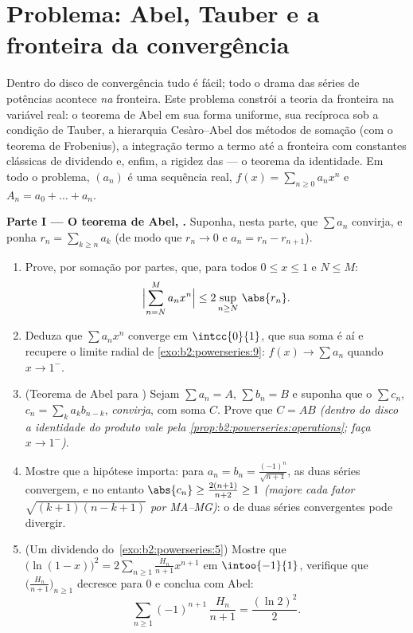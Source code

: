 \section{Problema: Abel, Tauber e a fronteira da convergência}

\begin{problem}\label{pb:b2:powerseries:1}
Dentro do disco de convergência tudo é fácil; todo o
drama das séries de potências acontece \emph{na} fronteira. Este
problema constrói a teoria da fronteira na variável real: o teorema de
Abel em sua forma uniforme, sua recíproca sob a condição de Tauber,
a hierarquia Cesàro--Abel dos métodos de somação
(com o teorema de Frobenius), a integração termo a termo até a
fronteira com constantes clássicas de dividendo e, enfim,
a rigidez das  --- o teorema da
identidade.
Em todo o problema, $(a_n)$ é uma sequência real, $f(x) = \sum_{n\geq0}
a_nx^n$ e $A_n = a_0 + \dots + a_n$.

\medskip
\noindent\textbf{Parte I --- O teorema de Abel, .} Suponha,
nesta parte, que $\sum a_n$ convirja, e ponha $r_n =
\sum_{k\geq n} a_k$ (de modo que $r_n \to 0$ e $a_n = r_n -
r_{n+1}$).
\begin{enumerate}
  \item Prove, por somação por partes, que, para todos $0 \leq x
        \leq 1$ e $N \leq M$:
        \[
        \Bigl|\sum_{n=N}^{M} a_n x^n\Bigr|
        \leq 2\sup_{n \geq N}\,\abs{r_n} .
        \]
  \item Deduza que $\sum a_nx^n$ converge \emph{} em
        $\intcc{0}{1}$, que sua soma é  aí e
        recupere o limite radial de
        \cref{exo:b2:powerseries:9}: $f(x) \to \sum a_n$ quando $x
        \to 1^-$.
  \item (Teorema de Abel para ) Sejam $\sum a_n = A$,
        $\sum b_n = B$ e suponha que o  $\sum
        c_n$, $c_n = \sum_{k} a_kb_{n-k}$, \emph{convirja},
        com soma $C$. Prove que $C = AB$ \emph{(dentro do disco a
        identidade do produto vale pela
        \cref{prop:b2:powerseries:operations}; faça $x \to
        1^-$)}.
  \item Mostre que a hipótese importa: para $a_n = b_n =
        \frac{(-1)^n}{\sqrt{n+1}}$, as duas séries convergem, e no entanto
        $\abs{c_n} \geq \frac{2(n+1)}{n+2} \geq 1$ \emph{(majore
        cada fator $\sqrt{(k+1)(n-k+1)}$ por MA--MG)}: o
         de duas séries convergentes pode divergir.
  \item (Um dividendo do~\cref{exo:b2:powerseries:5}) Mostre que
        $\bigl(\ln(1-x)\bigr)^2 = 2\sum_{n\geq1}
        \frac{H_n}{n+1}x^{n+1}$ em $\intoo{-1}{1}$, verifique que
        $\bigl(\frac{H_n}{n+1}\bigr)_{n\geq1}$ decresce para
        $0$ e conclua com Abel:
        \[
        \sum_{n\geq1} (-1)^{n+1}\,\frac{H_n}{n+1}
        = \frac{(\ln 2)^2}{2} .
        \]
\end{enumerate}


\end{problem}
